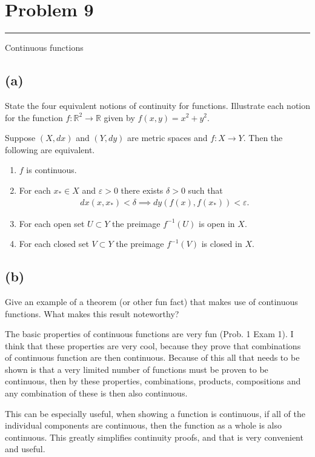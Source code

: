 \documentclass[12pt]{amsart}
\newcommand{\usec}[1]{%
  \section*{#1}%
  \noindent\rule{\textwidth}{2pt}%
  \vspace{10pt}%
}
\newcommand{\prob}[1]{Prob. #1}
\newcommand{\R}{\mathbb{R}}
\begin{document}
  \usec{Problem 9}%
  \label{sec:problem_9}

  Continuous functions

  \subsection*{(a)}%
  \label{sub:_a_}

  State the four equivalent notions of continuity for functions. Illustrate each
  notion for the function $f:\R^2\to\R$ given by $f(x,y)=x^2+y^2$.

  Suppose $(X,dx)$ and $(Y,dy)$ are metric spaces and $f:X\to Y$. Then the
  following are equivalent.

  \begin{enumerate}
    \item $f$ is continuous.
    \item For each $x_*\in X$ and $\varepsilon >0$ there exists $\delta >0$ such
      that
      \begin{align*}
        dx(x,x_*)<\delta\implies dy(f(x),f(x_*))<\varepsilon.
      \end{align*}
    \item For each open set $U\subset Y$ the preimage $f^{-1}(U)$ is open in $X$.
    \item For each closed set $V\subset Y$ the preimage $f^{-1}(V)$ is closed in
      $X$.
  \end{enumerate}

  \noindent\fbox{\parbox{\textwidth}{$\ $\vspace{9in}}}

  \subsection*{(b)}%
  \label{sub:_b_}

  Give an example of a theorem (or other fun fact) that makes use of continuous
  functions. What makes this result noteworthy?

  The basic properties of continuous functions are very fun (\prob{1} Exam 1). I
  think that these properties are very cool, because they prove that
  combinations of continuous function are then continuous. Because of this all
  that needs to be shown is that a very limited number of functions must be
  proven to be continuous, then by these properties, combinations, products,
  compositions and any combination of these is then also continuous.

  This can be especially useful, when showing a function is continuous, if all of
  the individual components are continuous, then the function as a whole is also
  continuous. This greatly simplifies continuity proofs, and that is very
  convenient and useful.
\end{document}
